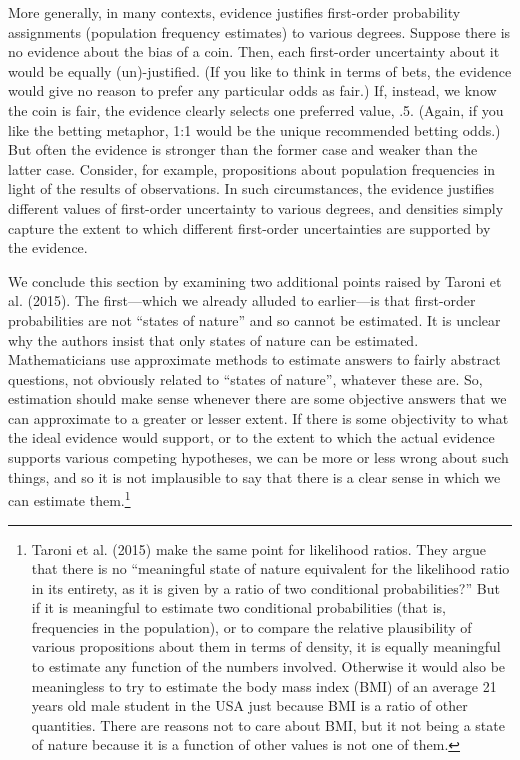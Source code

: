 \documentclass[
  10pt,
  dvipsnames,enabledeprecatedfontcommands]{scrartcl}
\begin{document}
More generally, in many contexts, evidence justifies first-order
probability assignments (population frequency estimates) to various
degrees. Suppose there is no evidence about the bias of a coin. Then,
each first-order uncertainty about it would be equally (un)-justified.
(If you like to think in terms of bets, the evidence would give no
reason to prefer any particular odds as fair.) If, instead, we know the
coin is fair, the evidence clearly selects one preferred value, .5.
(Again, if you like the betting metaphor, 1:1 would be the unique
recommended betting odds.) But often the evidence is stronger than the
former case and weaker than the latter case. Consider, for example,
propositions about population frequencies in light of the results of
observations. In such circumstances, the evidence justifies different
values of first-order uncertainty to various degrees, and densities
simply capture the extent to which different first-order uncertainties
are supported by the evidence.

We conclude this section by examining two additional points raised by
Taroni et al. (2015). The first---which we already alluded to
earlier---is that first-order probabilities are not ``states of nature''
and so cannot be estimated. It is unclear why the authors insist that
only states of nature can be estimated. Mathematicians use approximate
methods to estimate answers to fairly abstract questions, not obviously
related to ``states of nature'', whatever these are. So, estimation
should make sense whenever there are some objective answers that we can
approximate to a greater or lesser extent. If there is some objectivity
to what the ideal evidence would support, or to the extent to which the
actual evidence supports various competing hypotheses, we can be more or
less wrong about such things, and so it is not implausible to say that
there is a clear sense in which we can estimate them.\footnote{Taroni et
  al. (2015) make the same point for likelihood ratios. They argue that
  there is no ``meaningful state of nature equivalent for the likelihood
  ratio in its entirety, as it is given by a ratio of two conditional
  probabilities?'' But if it is meaningful to estimate two conditional
  probabilities (that is, frequencies in the population), or to compare
  the relative plausibility of various propositions about them in terms
  of density, it is equally meaningful to estimate any function of the
  numbers involved. Otherwise it would also be meaningless to try to
  estimate the body mass index (BMI) of an average 21 years old male
  student in the USA just because BMI is a ratio of other quantities.
  There are reasons not to care about BMI, but it not being a state of
  nature because it is a function of other values is not one of them.}
\end{document}
